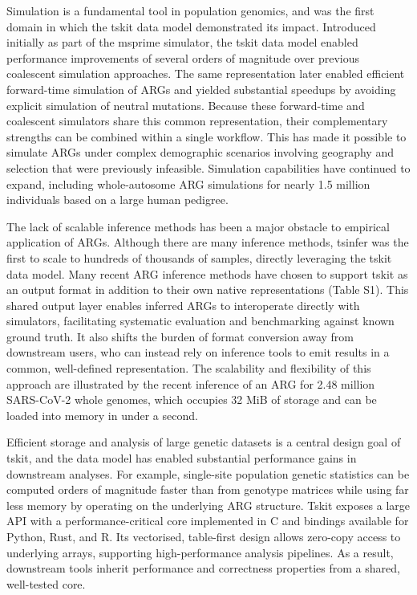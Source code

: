 \documentclass{article}
\begin{document}
Simulation is a fundamental tool in population genomics, and
was the first domain in which the tskit data model demonstrated its impact.
Introduced initially as part of the msprime simulator,
the tskit data model enabled performance improvements of
several orders of magnitude
over previous coalescent simulation approaches\cite{kelleher2016efficient}.
The same representation later
enabled efficient forward-time simulation of ARGs
and yielded substantial speedups by avoiding
explicit simulation of neutral mutations\cite{kelleher2018efficient}.
Because these forward-time and coalescent
simulators share this common representation, their complementary
strengths can be combined within a single workflow. This has made it possible
to simulate ARGs under complex demographic scenarios involving geography and
selection that were previously infeasible.
Simulation capabilities have continued to expand,
including whole-autosome ARG simulations for nearly 1.5 million individuals
based on a large human pedigree\cite{andersontrocme2023genes}.


The lack of scalable inference methods has been a major obstacle
to empirical application of ARGs. Although there
are many inference methods\cite{wong2024general},
tsinfer was the first to scale to hundreds of thousands of samples,
directly leveraging the tskit data model\cite{kelleher2019inferring}.
Many recent ARG inference methods have chosen to support tskit
as an output format in addition to their
own native representations (Table S1).
This shared output layer enables inferred ARGs to
interoperate directly with simulators, facilitating systematic evaluation and
benchmarking against known ground truth. It also shifts the burden of format
conversion away from downstream users, who can instead rely on inference tools
to emit results in a common, well-defined representation. The scalability and
flexibility of this approach are illustrated by the recent inference of an ARG
for 2.48 million SARS-CoV-2 whole genomes, which occupies 32 MiB of storage and
can be loaded into memory in under a second\cite{zhan2025pandemic}.


Efficient storage and analysis of large genetic datasets is a central
design goal of tskit, and the data model has enabled substantial
performance gains in downstream analyses.
For example, single-site
population genetic statistics can be computed orders of magnitude faster than from
genotype matrices while using far less memory by operating
on the underlying ARG structure\cite{ralph2020efficiently}.
Tskit exposes a large API with a
performance-critical core implemented in C and bindings available for Python,
Rust, and R.
Its vectorised, table-first design allows zero-copy access to
underlying arrays, supporting high-performance analysis pipelines.
As a result,
downstream tools inherit performance and correctness properties from a shared,
well-tested core.
\end{document}
